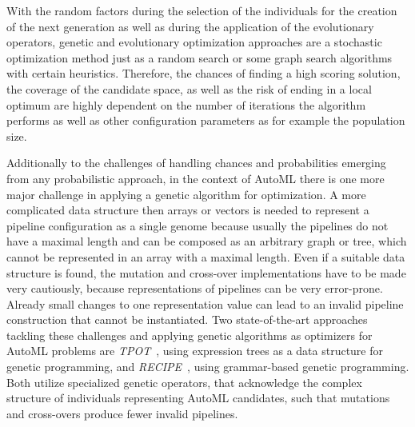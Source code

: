 With the random factors during the selection of the individuals for the creation of the next generation as well as during the application of the evolutionary operators, genetic and evolutionary optimization approaches are a stochastic optimization method just as a random search or some graph search algorithms with certain heuristics.
Therefore, the chances of finding a high scoring solution, the coverage of the candidate space, as well as the risk of ending in a local optimum are highly dependent on the number of iterations the algorithm performs as well as other configuration parameters as for example the population size.

Additionally to the challenges of handling chances and probabilities emerging from any probabilistic approach, in the context of AutoML there is one more major challenge in applying a genetic algorithm for optimization.
A more complicated data structure then arrays or vectors is needed to represent a pipeline configuration as a single genome because usually the pipelines do not have a maximal length and can be composed as an arbitrary graph or tree, which cannot be represented in an array with a maximal length.
Even if a suitable data structure is found, the mutation and cross-over implementations have to be made very cautiously, because representations of pipelines can be very error-prone.
Already small changes to one representation value can lead to an invalid pipeline construction that cannot be instantiated.\newline
Two state-of-the-art approaches tackling these challenges and applying genetic algorithms as optimizers for AutoML problems are \textit{TPOT}~\cite{Olson-Tpot}, using expression trees as a data structure for genetic programming, and \textit{RECIPE}~\cite{Guimar-Recipe}, using grammar-based genetic programming.
Both utilize specialized genetic operators, that acknowledge the complex structure of individuals representing AutoML candidates, such that mutations and cross-overs produce fewer invalid pipelines.

